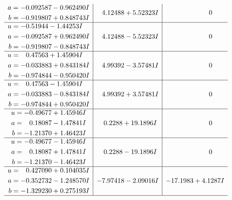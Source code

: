 \documentclass[1p]{elsarticle_modified}
\theoremstyle{definition}
\begin{document}
$$\begin{array}{c|c|c}
\begin{aligned}
a &= -0.092587 - 0.962490 I \\
b &= -0.919807 + 0.848743 I\end{aligned}
 & \phantom{-}4.12488 + 5.52323 I & \phantom{-0.000000 } 0 \\ \hline\begin{aligned}
u &= -0.51944 - 1.44253 I \\
a &= -0.092587 + 0.962490 I \\
b &= -0.919807 - 0.848743 I\end{aligned}
 & \phantom{-}4.12488 - 5.52323 I & \phantom{-0.000000 } 0 \\ \hline\begin{aligned}
u &= \phantom{-}0.47563 + 1.45904 I \\
a &= -0.033883 + 0.843184 I \\
b &= -0.974844 - 0.950420 I\end{aligned}
 & \phantom{-}4.99392 - 3.57481 I & \phantom{-0.000000 } 0 \\ \hline\begin{aligned}
u &= \phantom{-}0.47563 - 1.45904 I \\
a &= -0.033883 - 0.843184 I \\
b &= -0.974844 + 0.950420 I\end{aligned}
 & \phantom{-}4.99392 + 3.57481 I & \phantom{-0.000000 } 0 \\ \hline\begin{aligned}
u &= -0.49677 + 1.45946 I \\
a &= \phantom{-}0.18087 - 1.47841 I \\
b &= -1.21370 + 1.46423 I\end{aligned}
 & \phantom{-}0.2288 + 19.1896 I & \phantom{-0.000000 } 0 \\ \hline\begin{aligned}
u &= -0.49677 - 1.45946 I \\
a &= \phantom{-}0.18087 + 1.47841 I \\
b &= -1.21370 - 1.46423 I\end{aligned}
 & \phantom{-}0.2288 - 19.1896 I & \phantom{-0.000000 } 0 \\ \hline\begin{aligned}
u &= \phantom{-}0.427090 + 0.104035 I \\
a &= -0.352732 - 1.248570 I \\
b &= -1.329230 + 0.275193 I\end{aligned}
 & -7.97418 - 2.09016 I & -17.1983 + 4.1287 I\\
 \hline 

\end{array}$$
\end{document}
